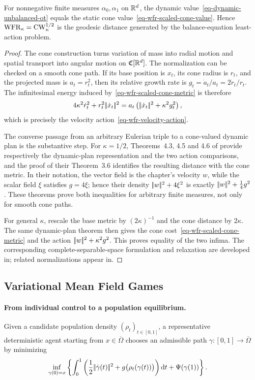 \begin{prop}\label{prop-static-dynamic-unbalanced}
For nonnegative finite measures $\alpha_0,\alpha_1$ on $\mathbb{R}^d$, the dynamic value~\eqref{eq-dynamic-unbalanced-ot} equals the static cone value~\eqref{eq-wfr-scaled-cone-value}. Hence $\operatorname{WFR}_\kappa=\operatorname{CW}_\kappa^{1/2}$ is the geodesic distance generated by the balance-equation least-action problem.
\end{prop}
\begin{proof}
The cone construction turns variation of mass into radial motion and spatial transport into angular motion on $\mathfrak C[\mathbb{R}^d]$. The normalization can be checked on a smooth cone path. If its base position is $x_t$, its cone radius is $r_t$, and the projected mass is $a_t=r_t^2$, then its relative growth rate is $g_t=\dot a_t/a_t=2\dot r_t/r_t$. The infinitesimal energy induced by~\eqref{eq-wfr-scaled-cone-metric} is therefore
\[
4\kappa^2\dot r_t^2+r_t^2|\!| \dot x_t |\!|^2
=
a_t\left(|\!| \dot x_t |\!|^2+\kappa^2g_t^2\right),
\]
which is precisely the velocity action~\eqref{eq-wfr-velocity-action}.

The converse passage from an arbitrary Eulerian triple to a cone-valued dynamic plan is the substantive step. For $\kappa=1/2$, Theorems~4.3, 4.5 and 4.6 of provide respectively the dynamic-plan representation and the two action comparisons, and the proof of their Theorem~3.6 identifies the resulting distance with the cone metric. In their notation, the vector field is the chapter's velocity $w$, while the scalar field $\xi$ satisfies $g=4\xi$; hence their density $|\!| w |\!|^2+4\xi^2$ is exactly $|\!| w |\!|^2+\tfrac14g^2$. These theorems prove both inequalities for arbitrary finite measures, not only for smooth cone paths.

For general $\kappa$, rescale the base metric by $(2\kappa)^{-1}$ and the cone distance by $2\kappa$. The same dynamic-plan theorem then gives the cone cost~\eqref{eq-wfr-scaled-cone-metric} and the action $|\!| w |\!|^2+\kappa^2g^2$. This proves equality of the two infima. The corresponding complete-separable-space formulation and relaxation are developed in; related normalizations appear in.
\end{proof}
\subsection{Variational Mean Field Games}
\label{sec-variational-mean-field-games}
\paragraph{From individual control to a population equilibrium.}
Given a candidate population density $(\rho_t)_{t\in[0,1]}$, a representative deterministic agent starting from $x\in\overline\Omega$ chooses an admissible path $\gamma:[0,1]\to\overline\Omega$ by minimizing
\begin{equation}\label{eq-mfg-individual-control}
\inf_{\gamma(0)=x}
\left\{
\int_0^1
\left(
\frac12|\!| \dot\gamma(t) |\!|^2
+g\bigl(\rho_t(\gamma(t))\bigr)
\right)\mathrm{d} t
+\Psi(\gamma(1))
\right\}.
\end{equation}
